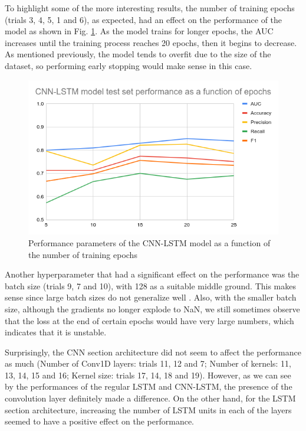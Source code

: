 \documentclass[format=sigconf, nonacm=true, review=true, screen=true]{acmart}
\begin{document}
To highlight some of the more interesting results, the number of training epochs (trials 3, 4, 5, 1 and 6), as expected, had an effect on the performance of the model as shown in Fig. \ref{fig:cnn-lstm_training_epochs}. As the model trains for longer epochs, the AUC increases until the training process reaches 20 epochs, then it begins to decrease. As mentioned previously, the model tends to overfit due to the size of the dataset, so performing early stopping would make sense in this case.

\begin{figure}
    \centering
    \includegraphics[width=\columnwidth]{figures/cnn-lstm_test_epochs.png}
    \caption{Performance parameters of the CNN-LSTM model as a function of the number of training epochs}
    \label{fig:cnn-lstm_training_epochs}
\end{figure}

Another hyperparameter that had a significant effect on the performance was the batch size (trials 9, 7 and 10), with 128 as a suitable middle ground. This makes sense since large batch sizes do not generalize well \cite{KeskarMNST16}. Also, with the smaller batch size, although the gradients no longer explode to NaN, we still sometimes observe that the loss at the end of certain epochs would have very large numbers, which indicates that it is unstable.

Surprisingly, the CNN section architecture did not seem to affect the performance as much (Number of Conv1D layers: trials 11, 12 and 7; Number of kernels: 11, 13, 14, 15 and 16; Kernel size: trials 17, 14, 18 and 19). However, as we can see by the performances of the regular LSTM and CNN-LSTM, the presence of the convolution layer definitely made a difference.
On the other hand, for the LSTM section architecture, increasing the number of LSTM units in each of the layers seemed to have a positive effect on the performance.
\end{document}

